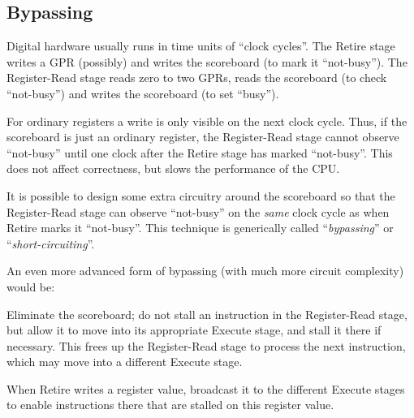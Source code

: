 
\subsection{Bypassing}

\label{Sec_Bypassing}


Digital hardware usually runs in time units of ``clock cycles''.  The
Retire stage writes a GPR (possibly) and writes the scoreboard (to
mark it ``not-busy'').  The Register-Read stage reads zero to two
GPRs, reads the scoreboard (to check ``not-busy'') and writes the
scoreboard (to set ``busy'').

\vspace{1ex}

For ordinary registers a write is only visible on the next clock
cycle.  Thus, if the scoreboard is just an ordinary register, the
Register-Read stage cannot observe ``not-busy'' until one clock after
the Retire stage has marked ``not-busy''.  This does not affect
correctness, but slows the performance of the CPU.

\vspace{1ex}

It is possible to design some extra circuitry around the scoreboard so
that the Register-Read stage can observe ``not-busy'' on the
\emph{same} clock cycle as when Retire marks it ``not-busy''.  This
technique is generically called ``\emph{bypassing}'' or
``\emph{short-circuiting}''.




An even more advanced form of bypassing (with much more circuit
complexity) would be:

\begin{tightlist}

 \item Eliminate the scoreboard; do not stall an instruction in the
     Register-Read stage, but allow it to move into its appropriate
     Execute stage, and stall it there if necessary.  This frees up
     the Register-Read stage to process the next instruction, which
     may move into a different Execute stage.

 \item When Retire writes a register value, broadcast it to the
     different Execute stages to enable instructions there that are
     stalled on this register value.

\end{tightlist}

